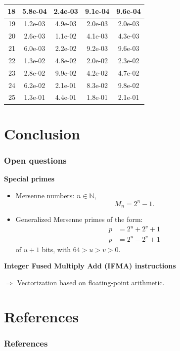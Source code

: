 \documentclass[10pt]{beamer}
\begin{document}
\begin{frame}
\begin{center}
{\begin{tabular}{|r|*{4}{c|}}
            \hline
            \cellcolor{myGray} 18 & 5.8e-04 & 2.4e-03 & 9.1e-04 & 9.6e-04 \\
            \hline
            \cellcolor{myGray} 19 & 1.2e-03 & 4.9e-03 & 2.0e-03 & 2.0e-03 \\
            \hline
            \cellcolor{myGray} 20 & 2.6e-03 & 1.1e-02 & 4.1e-03 & 4.3e-03 \\
            \hline
            \cellcolor{myGray} 21 & 6.0e-03 & 2.2e-02 & 9.2e-03 & 9.6e-03 \\
            \hline
            \cellcolor{myGray} 22 & 1.3e-02 & 4.8e-02 & 2.0e-02 & 2.3e-02 \\
            \hline
            \cellcolor{myGray} 23 & 2.8e-02 & 9.9e-02 & 4.2e-02 & 4.7e-02 \\
            \hline
            \cellcolor{myGray} 24 & 6.2e-02 & 2.1e-01 & 8.3e-02 & 9.8e-02 \\
            \hline
            \cellcolor{myGray} 25 & 1.3e-01 & 4.4e-01 & 1.8e-01 & 2.1e-01 \\
            \hline
        \end{tabular}
        }
    \end{center}
\end{frame}

\section{Conclusion}
\begin{frame}
    \frametitle{Open questions}

    \textbf{Special primes}
    \begin{itemize}
        \item Mersenne numbers: $n\in \mathbb{N}$,
            $$M_n = 2^n - 1.$$
        \item Generalized Mersenne primes of the form:
            \begin{align*}
                p &= 2^u + 2^v + 1 \\ 
                p &= 2^u - 2^v + 1 
            \end{align*}
            of $u+1$ bits, with $64 > u > v > 0$.
    \end{itemize}

    \bigskip
    \textbf{Integer Fused Multiply Add (IFMA) instructions}
    
    $\Longrightarrow$ Vectorization based on floating-point arithmetic.

\end{frame}

\section{References}
\begin{frame}
    \frametitle{References}

     
     
    \nocite{*}
\end{frame}
\end{document}
